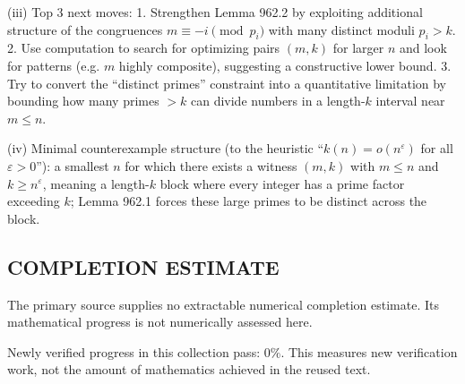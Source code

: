 (iii) Top 3 next moves:
1. Strengthen Lemma 962.2 by exploiting additional structure of the congruences $m\equiv -i\pmod{p_i}$ with many distinct moduli $p_i>k$.
2. Use computation to search for optimizing pairs $(m,k)$ for larger $n$ and look for patterns (e.g. $m$ highly composite), suggesting a constructive lower bound.
3. Try to convert the “distinct primes” constraint into a quantitative limitation by bounding how many primes $>k$ can divide numbers in a length-$k$ interval near $m\le n$.

(iv) Minimal counterexample structure (to the heuristic “$k(n)=o(n^\varepsilon)$ for all $\varepsilon>0$”): a smallest $n$ for which there exists a witness $(m,k)$ with $m\le n$ and $k\ge n^\varepsilon$, meaning a length-$k$ block where every integer has a prime factor exceeding $k$; Lemma 962.1 forces these large primes to be distinct across the block.




\subsection*{COMPLETION ESTIMATE}
The primary source supplies no extractable numerical completion estimate. Its mathematical progress is not numerically assessed here.

Newly verified progress in this collection pass: $0\%$. This measures new verification work, not the amount of mathematics achieved in the reused text.
